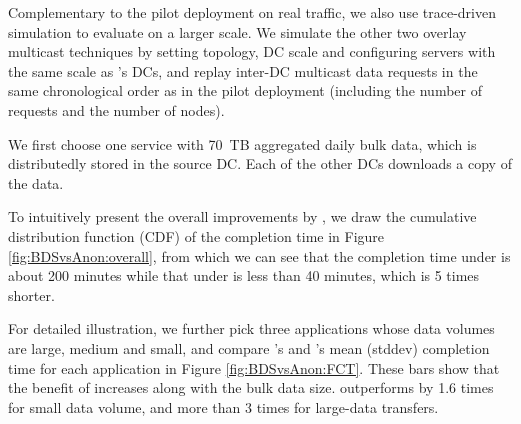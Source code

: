  Complementary to the pilot deployment on real traffic, we also use trace-driven simulation to evaluate \name on a larger scale.
We simulate the other two overlay multicast techniques by setting topology, DC scale and configuring servers with the same scale as \name's DCs, and replay inter-DC multicast data requests in the same chronological
order as in the pilot deployment (including the number of requests and the number of nodes).




We first choose one service with 70~TB aggregated daily bulk data, which is distributedly stored in the source DC. Each of the other DCs downloads a copy of the data.%


To intuitively present the overall improvements by \name, we draw the cumulative distribution function (CDF) of the completion time in Figure \ref{fig:BDSvsAnon:overall}, from which we can see that the completion time under \alg is about 200 minutes while that under \name is less than 40 minutes, which is 5 times shorter.

For detailed illustration, we further pick three applications whose data volumes are large, medium and small, and compare \name's and \alg's mean (stddev) completion time for each application in Figure \ref{fig:BDSvsAnon:FCT}.
These bars show that the benefit of \name increases along with the bulk data size. \name outperforms \alg by 1.6 times for small data volume, and more than 3 times for large-data transfers.

